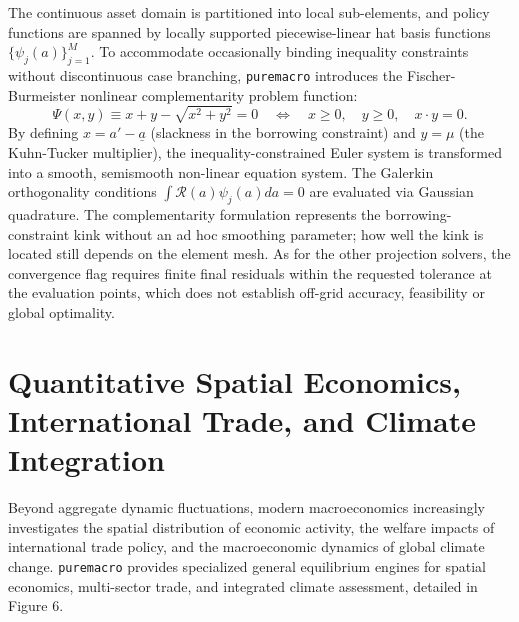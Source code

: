 \documentclass[11pt,letterpaper]{article}
\renewcommand{\_}{\pmunderscore\allowbreak}
\begin{document}
The continuous asset domain is partitioned into local sub-elements, and policy functions are spanned by locally supported piecewise-linear hat basis functions \(\{\psi_j(a)\}_{j=1}^M\). To accommodate occasionally binding inequality constraints without discontinuous case branching, \texttt{puremacro} introduces the Fischer-Burmeister nonlinear complementarity problem function:
\[\Psi(x, y) \equiv x + y - \sqrt{x^2 + y^2} = 0 \quad \Longleftrightarrow \quad x \ge 0, \quad y \ge 0, \quad x \cdot y = 0.\]
By defining \(x = a' - \underline{a}\) (slackness in the borrowing constraint) and \(y = \mu\) (the Kuhn-Tucker multiplier), the inequality-constrained Euler system is transformed into a smooth, semismooth non-linear equation system. The Galerkin orthogonality conditions \(\int \mathcal{R}(a) \psi_j(a) da = 0\) are evaluated via Gaussian quadrature. The complementarity formulation represents the borrowing-constraint kink without an ad hoc smoothing parameter; how well the kink is located still depends on the element mesh. As for the other projection solvers, the convergence flag requires finite final residuals within the requested tolerance at the evaluation points, which does not establish off-grid accuracy, feasibility or global optimality.

\section{Quantitative Spatial Economics, International Trade, and Climate Integration}\label{quantitative-spatial-economics-international-trade-and-climate-integration}

Beyond aggregate dynamic fluctuations, modern macroeconomics increasingly investigates the spatial distribution of economic activity, the welfare impacts of international trade policy, and the macroeconomic dynamics of global climate change. \texttt{puremacro} provides specialized general equilibrium engines for spatial economics, multi-sector trade, and integrated climate assessment, detailed in Figure 6.
\end{document}
